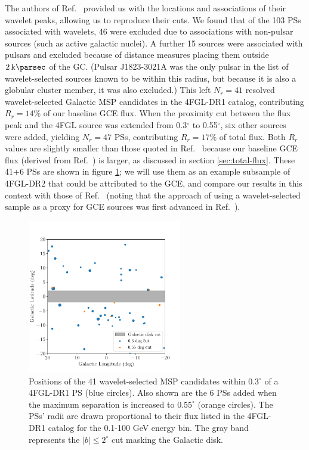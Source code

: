 \documentclass[letter,11pt]{article}
\begin{document}
The authors of Ref.~\cite{Zhong:2019ycb} provided us with the locations and associations of their wavelet peaks, allowing us to reproduce their cuts. We found that of the 103 PSs associated with wavelets, 46 were excluded due to associations with non-pulsar sources (such as active galactic nuclei). A further 15 sources were associated with pulsars and excluded because of distance measures placing them outside $\SI{2}{\kilo\parsec}$ of the GC. (Pulsar J1823-3021A was the only pulsar in the list of wavelet-selected sources known to be within this radius, but because it is also a globular cluster member, it was also excluded.) This left $N_r=41$ resolved wavelet-selected Galactic MSP candidates in the 4FGL-DR1 catalog, contributing $R_r=14\%$ of our baseline GCE flux. When the proximity cut between the flux peak and the 4FGL source was extended from 0.3$^\circ$ to 0.55$^\circ$, six other sources were added, yielding $N_r=47$ PSs, contributing $R_r=17\%$ of total flux. Both $R_r$ values are slightly smaller than those quoted in Ref.~\cite{Zhong:2019ycb} because our baseline GCE flux (derived from Ref.~\cite{DiMauro:2021raz}) is larger, as discussed in section \ref{sec:total-flux}. These 41+6 PSs are shown in figure \ref{fig:47-sources}; we will use them as an example subsample of 4FGL-DR2 that could be attributed to the GCE, and compare our results in this context with those of Ref.~\cite{Zhong:2019ycb} (noting that the approach of using a wavelet-selected sample as a proxy for GCE sources was first advanced in Ref.~\cite{Bartels:2015aea}).

\begin{figure}
    \centering
    \includegraphics[width=0.6\textwidth]{figs/point-source-positions.pdf}
    \caption{Positions of the 41 wavelet-selected MSP candidates within $0.3^\circ$ of a 4FGL-DR1 PS (blue circles). Also shown are the 6 PSs added when the maximum separation is increased to $0.55^\circ$  (orange circles). The PSs' radii are drawn proportional to their flux listed in the 4FGL-DR1 catalog for the 0.1-100 GeV energy bin. The gray band represents the $|b| \leq 2^\circ$ cut masking the Galactic disk.}
    \label{fig:47-sources}
\end{figure}
\end{document}
